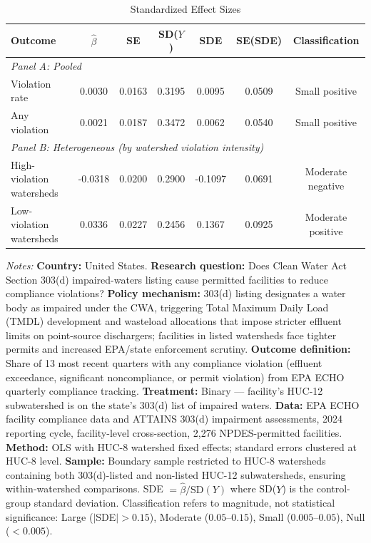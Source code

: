 \begin{table}[htbp]
\centering
\caption{Standardized Effect Sizes}
\label{tab:sde}
\footnotesize
\begin{tabular}{lcccccc}
\hline\hline
Outcome & $\hat{\beta}$ & SE & SD($Y$) & SDE & SE(SDE) & Classification \\
\hline
\multicolumn{7}{l}{\textit{Panel A: Pooled}} \\
Violation rate & 0.0030 & 0.0163 & 0.3195 & 0.0095 & 0.0509 & Small positive \\
Any violation & 0.0021 & 0.0187 & 0.3472 & 0.0062 & 0.0540 & Small positive \\
\hline
\multicolumn{7}{l}{\textit{Panel B: Heterogeneous (by watershed violation intensity)}} \\
High-violation watersheds & -0.0318 & 0.0200 & 0.2900 & -0.1097 & 0.0691 & Moderate negative \\
Low-violation watersheds & 0.0336 & 0.0227 & 0.2456 & 0.1367 & 0.0925 & Moderate positive \\
\hline\hline
\end{tabular}
\begin{tablenotes}[flushleft]\footnotesize
\item \textit{Notes:} \textbf{Country:} United States. \textbf{Research question:} Does Clean Water Act Section 303(d) impaired-waters listing cause permitted facilities to reduce compliance violations? \textbf{Policy mechanism:} 303(d) listing designates a water body as impaired under the CWA, triggering Total Maximum Daily Load (TMDL) development and wasteload allocations that impose stricter effluent limits on point-source dischargers; facilities in listed watersheds face tighter permits and increased EPA/state enforcement scrutiny. \textbf{Outcome definition:} Share of 13 most recent quarters with any compliance violation (effluent exceedance, significant noncompliance, or permit violation) from EPA ECHO quarterly compliance tracking. \textbf{Treatment:} Binary --- facility's HUC-12 subwatershed is on the state's 303(d) list of impaired waters. \textbf{Data:} EPA ECHO facility compliance data and ATTAINS 303(d) impairment assessments, 2024 reporting cycle, facility-level cross-section, 2,276 NPDES-permitted facilities. \textbf{Method:} OLS with HUC-8 watershed fixed effects; standard errors clustered at HUC-8 level. \textbf{Sample:} Boundary sample restricted to HUC-8 watersheds containing both 303(d)-listed and non-listed HUC-12 subwatersheds, ensuring within-watershed comparisons. SDE $= \hat{\beta} / \text{SD}(Y)$ where SD($Y$) is the control-group standard deviation. Classification refers to magnitude, not statistical significance: Large ($|$SDE$| > 0.15$), Moderate ($0.05$--$0.15$), Small ($0.005$--$0.05$), Null ($< 0.005$). 
\end{tablenotes}
\end{table}
